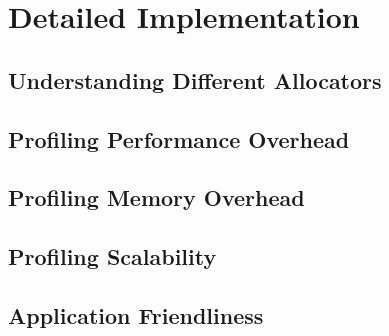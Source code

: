 \section{Detailed Implementation}

\subsection{Understanding Different Allocators}

\subsection{Profiling Performance Overhead}

\subsection{Profiling Memory Overhead}

\subsection{Profiling Scalability}

\subsection{Application Friendliness}
